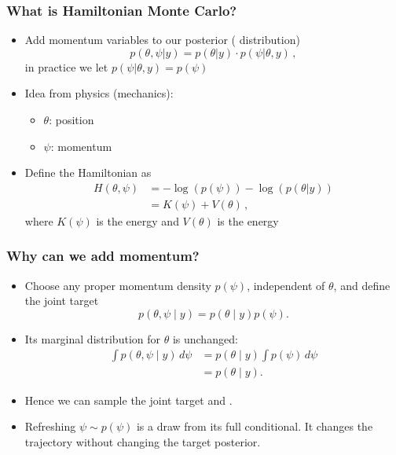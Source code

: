 \documentclass[10pt]{beamer}
\begin{document}
\begin{frame}
\frametitle{What is Hamiltonian Monte Carlo?}

\begin{itemize}
\item Add momentum variables to our posterior ( distribution)
\[
 p(\theta,\psi | y) = p(\theta | y) \cdot p(\psi | \theta , y)\,,
\]
in practice we let $p(\psi | \theta , y) = p(\psi)$
\pause
\item Idea from physics (mechanics):
\begin{itemize}
\item $\theta$: position
\item $\psi$: momentum
\end{itemize}
\pause
\item Define the Hamiltonian as
\begin{align}
H(\theta, \psi)  & = - \log(p(\psi)) - \log(p(\theta | y))\\
 & = K(\psi) + V(\theta)\,,
\end{align}
where $K(\psi)$ is the  energy and $V(\theta)$ is the  energy
\end{itemize}
\end{frame}

\begin{frame}
\frametitle{Why can we add momentum?}

\begin{itemize}
\item Choose any proper momentum density $p(\psi)$, independent of $\theta$,
  and define the joint target
  \[
  p(\theta,\psi\mid y)=p(\theta\mid y)p(\psi).
  \]
\pause
\item Its marginal distribution for $\theta$ is unchanged:
  \begin{align*}
  \int p(\theta,\psi\mid y)\,d\psi
    &=p(\theta\mid y)\int p(\psi)\,d\psi\\
    &=p(\theta\mid y).
  \end{align*}
\item Hence we can sample the joint target and .
\pause
\item Refreshing $\psi\sim p(\psi)$ is a draw from its full conditional.
  It changes the trajectory without changing the target posterior.
\end{itemize}
\end{frame}
\end{document}
